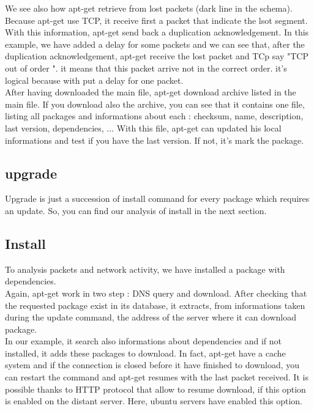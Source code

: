 \documentclass[twoside]{article}
\begin{document}
\begin{multicols}{2}
We see also how apt-get retrieve from lost packets (dark line in the schema).  Because apt-get use TCP, it receive first a packet that indicate the lsot segment.  With this information, apt-get send back a duplication acknowledgement.  In this example, we have added a delay for some packets and we can see that, after the duplication acknowledgement, apt-get receive the lost packet and TCp say "TCP out of order ".  it means that this packet arrive not in the correct order.  it's logical because with put a delay for one packet.\\
After having downloaded the main file, apt-get download archive listed in the main file.  If you download also the archive, you can see that it contains one file, listing all packages and informations about each : checksum, name, description, last version, dependencies, ...  With this file, apt-get can updated his local informations and test if you have the last version.  If not, it's mark the package.\\
\subsection{upgrade}
Upgrade is just a succession of install command for every package which requires an update.  So, you can find our analysis of install in the next section.

\subsection{Install}
To analysis packets and network activity, we have installed a package with dependencies.\\ 
Again, apt-get work in two step : DNS query and download.  After checking that the requested package exist in its database, it extracts, from informations taken during the update command, the address of the server where it can download package.\\
In our example, it search also informations about dependencies and if not installed, it adds these packages to download.  In fact, apt-get have a cache system and if the connection is closed before it have finished to download, you can restart the command and apt-get resumes with the last packet received.  It is possible thanks to HTTP protocol that allow to resume download, if this option is enabled on the distant server.  Here, ubuntu servers have enabled this option.\\ 

\end{multicols}
\end{document}

